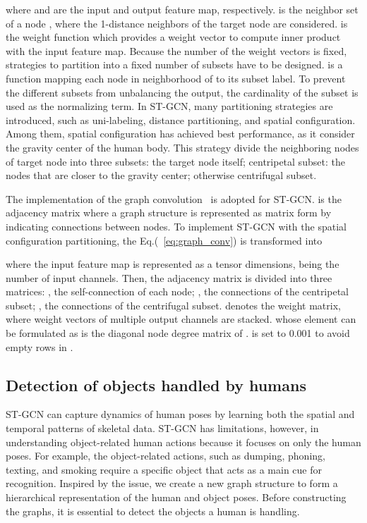 \documentclass[10pt,twocolumn,letterpaper]{article}
\begin{document}
where  and  are the input and output feature map, respectively. 
 is the neighbor set of a node , where the 1-distance neighbors of the target node  are considered.
 is the weight function which provides a weight vector to compute inner product with the input feature map.
Because the number of the weight vectors is fixed, strategies to partition  into a fixed number of subsets have to be designed. 
 is a function mapping each node in neighborhood of  to its subset label. 
To prevent the different subsets from unbalancing the output, the cardinality of the subset  is used as the normalizing term.
In ST-GCN, many partitioning strategies are introduced, such as uni-labeling, distance partitioning, and spatial configuration.
Among them, spatial configuration has achieved best performance, as it consider the gravity center of the human body.
This strategy divide the neighboring nodes of target node into three subsets: 
 the target node itself; 
 centripetal subset: the nodes that are closer to the gravity center; 
 otherwise centrifugal subset.

The implementation of the graph convolution~\cite{kipf2016semi} is adopted for ST-GCN. 
 is the  adjacency matrix where a graph structure is represented as matrix form by indicating connections between nodes.
To implement ST-GCN with the spatial configuration partitioning, the Eq.(~\ref{eq:graph_conv}) is transformed into

where the input feature map  is represented as a tensor  dimensions,  being the number of input channels.
Then, the adjacency matrix is divided into three matrices: 
 , the self-connection of each node; 
 , the connections of the centripetal subset; 
 , the connections of the centrifugal subset.
 denotes the weight matrix, where weight vectors of multiple output channels are stacked.
 whose element can be formulated as  is the diagonal node degree matrix of . 
 is set to 0.001 to avoid empty rows in .


\subsection{Detection of objects handled by humans}
\label{sec:obj-detect}

ST-GCN can capture dynamics of human poses by learning both the spatial and temporal patterns of skeletal data. 
ST-GCN has limitations, however, in understanding object-related human actions because it focuses on only the human poses.
For example, the object-related actions, such as dumping, phoning, texting, and smoking require a specific object that acts as a main cue for recognition.
Inspired by the issue, we create a new graph structure to form a hierarchical representation of the human and object poses.
Before constructing the graphs, it is essential to detect the objects a human is handling.
\end{document}
